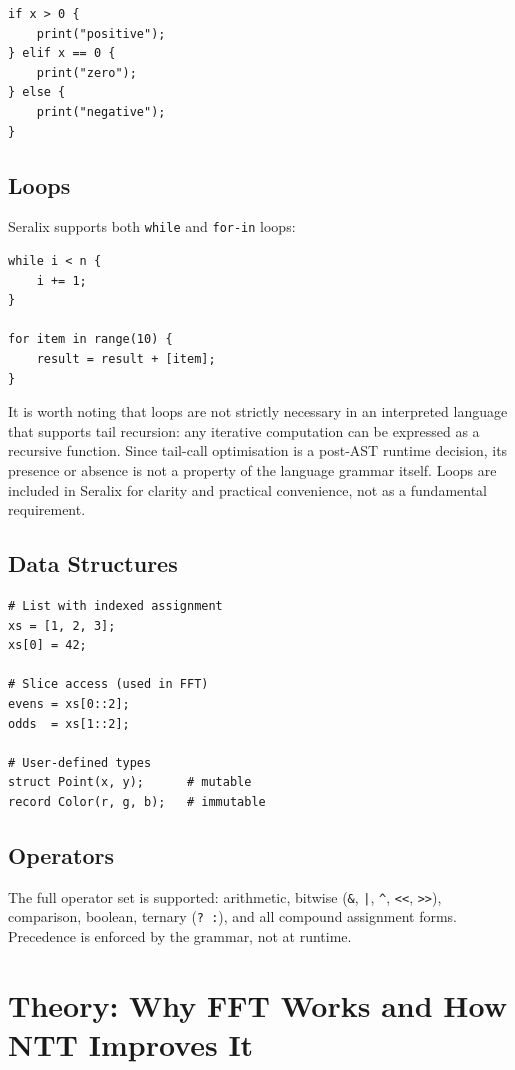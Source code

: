 \documentclass[conference]{IEEEtran}
\begin{document}
\begin{lstlisting}
if x > 0 {
    print("positive");
} elif x == 0 {
    print("zero");
} else {
    print("negative");
}
\end{lstlisting}

\subsection{Loops}

Seralix supports both \texttt{while} and \texttt{for-in} loops:

\begin{lstlisting}
while i < n {
    i += 1;
}

for item in range(10) {
    result = result + [item];
}
\end{lstlisting}

It is worth noting that loops are not strictly necessary in an interpreted language that supports tail recursion: any iterative computation can be expressed as a recursive function. Since tail-call optimisation is a post-AST runtime decision, its presence or absence is not a property of the language grammar itself. Loops are included in Seralix for clarity and practical convenience, not as a fundamental requirement.

\subsection{Data Structures}

\begin{lstlisting}
# List with indexed assignment
xs = [1, 2, 3];
xs[0] = 42;

# Slice access (used in FFT)
evens = xs[0::2];
odds  = xs[1::2];

# User-defined types
struct Point(x, y);      # mutable
record Color(r, g, b);   # immutable
\end{lstlisting}

\subsection{Operators}

The full operator set is supported: arithmetic, bitwise (\texttt{\&}, \texttt{|}, \texttt{\^{}}, \texttt{<<}, \texttt{>>}), comparison, boolean, ternary (\texttt{? :}), and all compound assignment forms. Precedence is enforced by the grammar, not at runtime.

\section{Theory: Why FFT Works and How NTT Improves It}
\end{document}

